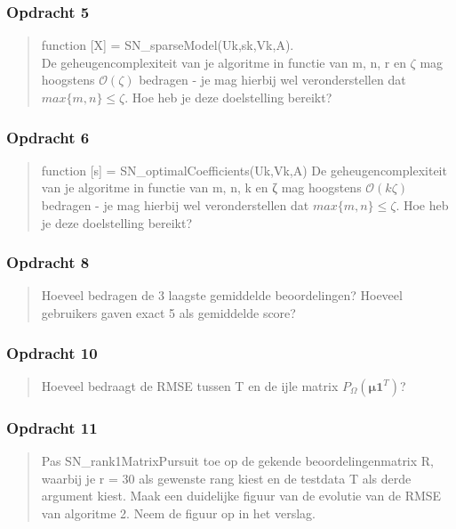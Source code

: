 \documentclass[11pt, a4paper, titlepage, openright]{article}
\begin{document}
	\subsubsection{Opdracht 5}
    \begin{quote}
        function [X] = SN\_sparseModel(Uk,sk,Vk,A). \\
        De geheugencomplexiteit van je algoritme in functie van m, n, r en \(\zeta\) mag hoogstens \(\mathcal{O}(\zeta)\) bedragen
        - je mag hierbij wel veronderstellen dat \( max\{m, n\} \leq \zeta \). Hoe heb je deze doelstelling bereikt?
    \end{quote}

	\subsubsection{Opdracht 6}
    \begin{quote}
        function [s] = SN\_optimalCoefficients(Uk,Vk,A)
        De geheugencomplexiteit van je algoritme in functie van m, n, k en ζ mag hoogstens \(\mathcal{O}(k\zeta)\) bedragen
        - je mag hierbij wel veronderstellen dat \( max\{m, n\} \leq \zeta \). Hoe heb je deze doelstelling bereikt?
    \end{quote}

	\subsubsection{Opdracht 8}
    \begin{quote}
        Hoeveel bedragen de 3 laagste gemiddelde beoordelingen? Hoeveel gebruikers gaven exact 5 als gemiddelde score?
    \end{quote}

	\subsubsection{Opdracht 10}
    \begin{quote}
        Hoeveel bedraagt de RMSE tussen T en de ijle matrix \( P_{\Omega}(\boldsymbol{\mu} \boldsymbol{1}^T ) \)?
    \end{quote}

	\subsubsection{Opdracht 11}
    \begin{quote}
        Pas SN\_rank1MatrixPursuit toe op de gekende beoordelingenmatrix R, waarbij je r = 30 als gewenste rang kiest en de testdata T
        als derde argument kiest. Maak een duidelijke figuur van de evolutie van de RMSE van algoritme 2. Neem de figuur op in het verslag.
    \end{quote}
\end{document}
